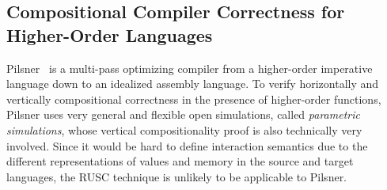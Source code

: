 {%



\subsection{Compositional Compiler Correctness for Higher-Order Languages}

%
Pilsner~\cite{neis:pilsner,pb} is a multi-pass optimizing compiler from
a higher-order imperative language down to an idealized assembly language.
To verify horizontally and vertically compositional correctness in the presence of higher-order functions, Pilsner uses
very general and flexible open simulations, called \emph{parametric simulations},
whose vertical compositionality proof is also technically very involved.
Since it would be hard to define interaction semantics
due to the different representations of values and
memory in the source and target languages,
the RUSC technique is unlikely to be applicable to Pilsner.

}
